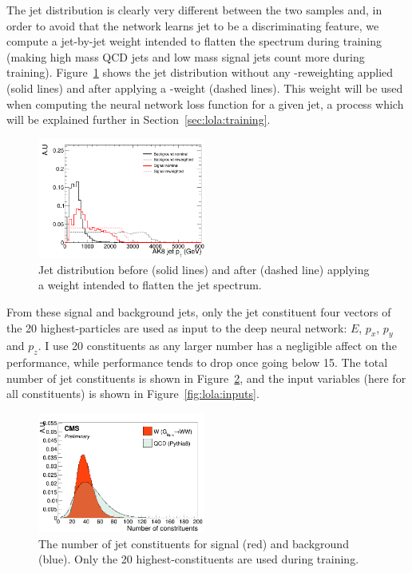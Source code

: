 The jet \PT distribution is clearly very different between the two samples and, in order to avoid that the network learns jet \PT to be a discriminating feature, we compute a jet-by-jet weight intended to flatten the \PT spectrum during training (making high mass QCD jets and low mass signal jets count more during training). Figure~\ref{fig:lola:ptweight} shows the jet \PT distribution without any \PT-reweighting applied (solid lines) and after applying a \PT-weight (dashed lines). This weight will be used when computing the neural network loss function for a given jet, a process which will be explained further in Section~\ref{sec:lola:training}.
\begin{figure}[h!]
\centering
\includegraphics[width=0.49\textwidth]{figures/vtagging/AN-18-099/input/pt_reweighted/postWeight.png}
\caption{Jet \PT distribution before (solid lines) and after (dashed line) applying a weight intended to flatten the jet \PT spectrum.}
\label{fig:lola:ptweight}
\end{figure}
From these signal and background jets, only the jet constituent four vectors of the 20 highest-\PT particles are used as input to the deep neural network: $E$, $p_x$, $p_y$ and $p_z$. I use 20 constituents as any larger number has a negligible affect on the performance, while performance tends to drop once going below 15. The total number of jet constituents is shown in Figure~\ref{fig:lola:nconst}, and the input variables (here for all constituents) is shown in Figure~\ref{fig:lola:inputs}.
\begin{figure}[h!]
\centering
\includegraphics[width=0.49\textwidth]{figures/vtagging/AN-18-099/input/inputs/sig-bkg/nconst.png}
\caption{The number of jet constituents for signal (red) and background (blue). Only the 20 highest-\PT constituents are used during training.}
\label{fig:lola:nconst}
\end{figure}
